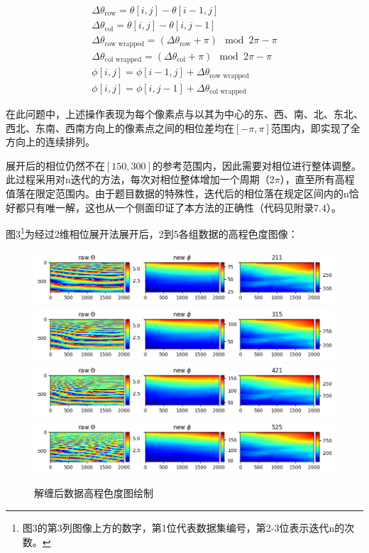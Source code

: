 \documentclass[a4paper]{article}
\begin{document}
	\begin{subequations}
		\begin{align}
			\Delta \theta_{\text{row}} = \theta[i, j] - \theta[i-1, j] \\
			\Delta \theta_{\text{col}} = \theta[i, j] - \theta[i, j-1] \\
			\Delta \theta_{\text{row wrapped}} = (\Delta \theta_{\text{row}} + \pi) \mod 2\pi - \pi \\
			\Delta \theta_{\text{col wrapped}} = (\Delta \theta_{\text{col}} + \pi) \mod 2\pi - \pi \\
			\phi[i, j] = \phi[i-1, j] + \Delta \theta_{\text{row wrapped}} \\
			\phi[i, j] = \phi[i, j-1] + \Delta \theta_{\text{col wrapped}}
		\end{align}
	\end{subequations}\indent
	
	在此问题中，上述操作表现为每个像素点与以其为中心的东、西、南、北、东北、西北、东南、西南方向上的像素点之间的相位差均在$ [-\pi,\pi] $范围内，即实现了全方向上的连续排列。\par
	展开后的相位仍然不在$ [150,300] $的参考范围内，因此需要对相位进行整体调整。此过程采用对n迭代的方法，每次对相位整体增加一个周期（$ 2\pi $），直至所有高程值落在限定范围内。由于题目数据的特殊性，迭代后的相位落在规定区间内的n恰好都只有唯一解，这也从一个侧面印证了本方法的正确性（代码见附录7.4）。\par
	图3\footnote{图3的第3列图像上方的数字，第1位代表数据集编号，第2-3位表示迭代n的次数。}为经过2维相位展开法展开后，2到5各组数据的高程色度图像：\par
	
	\begin{figure}[H]
		\centering
		\includegraphics[width=1\textwidth]{images/t1/unwrap2.png}
		\includegraphics[width=1\textwidth]{images/t1/unwrap3.png}
		\includegraphics[width=1\textwidth]{images/t1/unwrap4.png}
		\includegraphics[width=1\textwidth]{images/t1/unwrap5.png}
		
		\caption{解缠后数据高程色度图绘制}
		\label{fig:unwrap}
	\end{figure}
\end{document}
